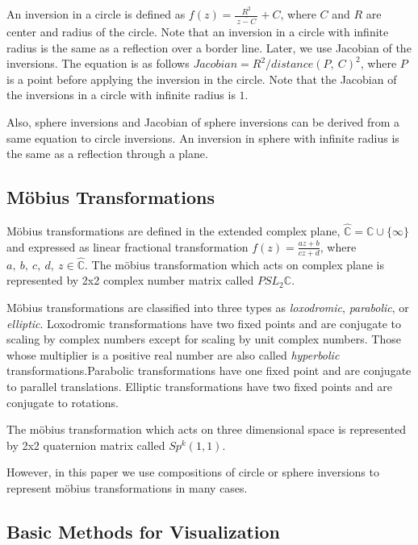 An inversion in a circle is defined as $f(z) = \frac{R^2}{~\overline{z -C}~} + C$,
where $C$ and $R$ are center and radius of the circle.
Note that an inversion in a circle with infinite radius is the same as
a reflection over a border line.
Later, we use Jacobian of the inversions. The equation is as follows
$Jacobian = R^2 / distance(P,~C)^2$, where $P$ is a point before
applying the inversion in the circle.
Note that the Jacobian of the inversions in a circle with
infinite radius is $1$.

Also, sphere inversions and Jacobian of sphere inversions can be
derived from a same equation to circle inversions.
An inversion in sphere with infinite radius is the same as a reflection
through a plane.

\subsection{M\"obius Transformations}

M\"obius transformations are defined in the extended complex plane,
$\hat{\mathbb{C}} = \mathbb{C} \cup \{\infty\}$ and expressed as linear
fractional transformation
$f(z)=\frac{az + b}{cz + d}$, where $a,~b,~c,~d,~z \in \hat{\mathbb{C}}$.
The m\"obius transformation which acts on complex plane is represented
by 2x2 complex number matrix called $PSL_2\mathbb{C}$.

M\"obius transformations are classified into three types as \textit{loxodromic},
\textit{parabolic}, or \textit{elliptic}.
Loxodromic transformations have two fixed points and are conjugate to
scaling by complex numbers except for scaling by unit complex numbers.
Those whose multiplier is a positive real number
are also called \textit{hyperbolic} transformations.Parabolic transformations
have one fixed point and are conjugate to parallel translations.
Elliptic transformations have two fixed points and are conjugate to rotations.

The m\"obius transformation which acts on three dimensional space is represented
by 2x2 quaternion matrix called $Sp^k(1, 1)$.

However, in this paper we use compositions of circle or sphere
inversions to represent m\"obius transformations in many cases.

\subsection{Basic Methods for Visualization}

